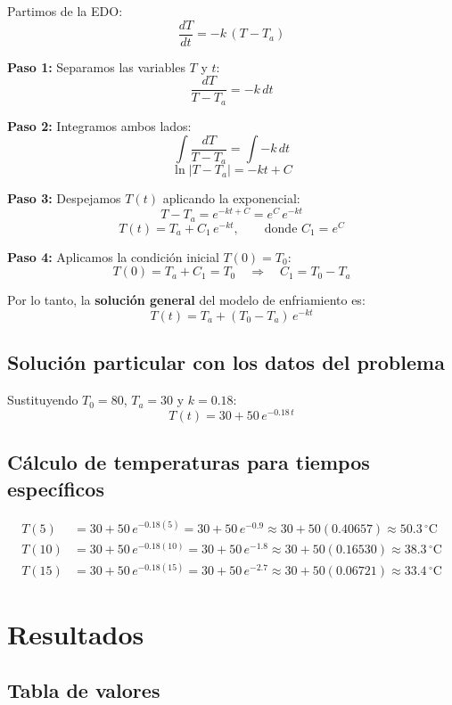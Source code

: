 \documentclass[12pt,a4paper]{article}
\begin{document}
Partimos de la EDO:
\[
\frac{dT}{dt} = -k\,(T - T_a)
\]

\textbf{Paso 1:} Separamos las variables \(T\) y \(t\):
\[
\frac{dT}{T - T_a} = -k\,dt
\]

\textbf{Paso 2:} Integramos ambos lados:
\[
\int \frac{dT}{T - T_a} = \int -k\,dt
\]
\[
\ln|T - T_a| = -k t + C
\]

\textbf{Paso 3:} Despejamos \(T(t)\) aplicando la exponencial:
\[
T - T_a = e^{-k t + C} = e^{C}\,e^{-k t}
\]
\[
T(t) = T_a + C_1\,e^{-k t},\qquad\text{donde } C_1 = e^{C}
\]

\textbf{Paso 4:} Aplicamos la condición inicial \(T(0)=T_0\):
\[
T(0) = T_a + C_1 = T_0 \quad\Longrightarrow\quad C_1 = T_0 - T_a
\]

Por lo tanto, la \textbf{solución general} del modelo de enfriamiento es:
\[
\boxed{T(t) = T_a + (T_0 - T_a)\,e^{-k t}}
\]

\subsection{Solución particular con los datos del problema}

Sustituyendo \(T_0 = 80\), \(T_a = 30\) y \(k = 0.18\):
\[
\boxed{T(t) = 30 + 50\,e^{-0.18\,t}}
\]

\subsection{Cálculo de temperaturas para tiempos específicos}

\begin{align*}
T(5)  &= 30 + 50\,e^{-0.18(5)}  = 30 + 50\,e^{-0.9}
        \approx 30 + 50(0.40657) \approx \boxed{50.3\,{}^\circ\mathrm{C}} \\[4pt]
T(10) &= 30 + 50\,e^{-0.18(10)} = 30 + 50\,e^{-1.8}
        \approx 30 + 50(0.16530) \approx \boxed{38.3\,{}^\circ\mathrm{C}} \\[4pt]
T(15) &= 30 + 50\,e^{-0.18(15)} = 30 + 50\,e^{-2.7}
        \approx 30 + 50(0.06721) \approx \boxed{33.4\,{}^\circ\mathrm{C}}
\end{align*}

\section{Resultados}

\subsection{Tabla de valores}
\end{document}
